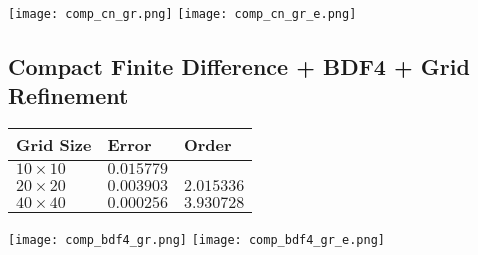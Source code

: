 \documentclass[12pt]{article}
\begin{document}
\texttt{[image: comp\_cn\_gr.png]}
\texttt{[image: comp\_cn\_gr\_e.png]}

\subsection{Compact Finite Difference + BDF4 + Grid Refinement}

\begin{center}
    \begin{tabular}{|l|l|l|}
\hline Grid Size & Error & Order \\
\hline $10 \times 10$ & $0.015779$ & \\
\hline $20 \times 20$ & $0.003903$ & $2.015336$ \\
\hline $40 \times 40$ & $0.000256$ & $3.930728$ \\
\hline
\end{tabular}
\end{center}

\texttt{[image: comp\_bdf4\_gr.png]}
\texttt{[image: comp\_bdf4\_gr\_e.png]}
\end{document}
